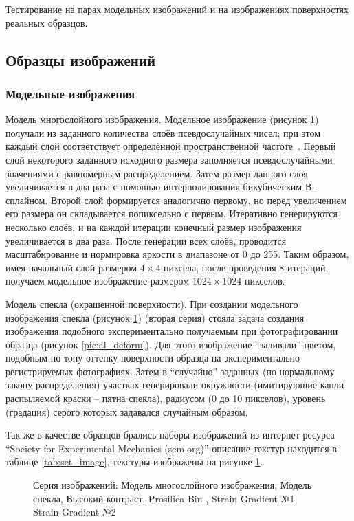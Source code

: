 Тестирование  на парах модельных изображений и на изображениях поверхностях реальных образцов.
\subsection{Образцы изображений}
\subsubsection{Модельные изображения}\label{mod_image}

Модель многослойного изображения.
Модельное изображение (рисунок \ref{pic:gray_mix}) получали из заданного количества слоёв псевдослучайных чисел; при этом каждый слой соответствует определённой пространственной частоте~\cite{pan_15}. Первый слой некоторого заданного исходного размера заполняется псевдослучайными значениями с равномерным распределением. Затем размер данного слоя увеличивается в два раза с помощью интерполирования бикубическим В-сплайном. Второй слой формируется аналогично первому, но перед увеличением его размера он складывается попиксельно с первым. Итеративно генерируются несколько слоёв, и на каждой итерации конечный размер изображения увеличивается в два раза. После генерации всех слоёв, проводится масштабирование и нормировка яркости в диапазоне от 0 до 255. Таким образом, имея начальный слой размером $4 \times 4$ пиксела, после проведения 8 итераций, получаем модельное изображение размером $1024 \times 1024$ пикселов.

Модель спекла (окрашенной поверхности). При создании модельного изображения спекла (рисунок \ref{pic:gray_mix}) (вторая серия) стояла задача создания изображения подобного экспериментально получаемым при фотографировании образца (рисунок \ref{pic:al_deform}). Для этого изображение ``заливали'' цветом, подобным по тону оттенку поверхности образца на экспериментально регистрируемых фотографиях. Затем в ``случайно'' заданных (по нормальному закону распределения) участках генерировали окружности (имитирующие капли распыляемой краски – пятна спекла), радиусом (0 до 10 пикселов), уровень (градация) серого которых задавался случайным образом.

Так же в качестве образцов брались наборы изображений из интернет ресурса ``Society for Experimental Mechanics (sem.org)'' описание текстур находится в таблице \ref{tab:set_image}, текстуры изображены на рисунке \ref{pic:gray_mix}.

\begin{figure}[h!]
\caption{Серия изображений: Модель многослойного изображения, Модель спекла, Высокий контраст, Prosilica Bin , Strain Gradient №1, Strain Gradient №2}
\label{pic:gray_mix}
\end{figure}

